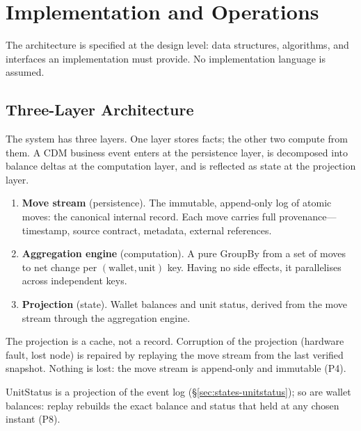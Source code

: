\section{Implementation and Operations}
\label{sec:implementation}

The architecture is specified at the design level: data structures, algorithms, and interfaces an implementation must provide. No implementation language is assumed.

\subsection{Three-Layer Architecture}
\label{sec:implementation-layers}

The system has three layers. One layer stores facts; the other two compute from them. A CDM business event enters at the persistence layer, is decomposed into balance deltas at the computation layer, and is reflected as state at the projection layer.

\begin{enumerate}[nosep]
\item \textbf{Move stream} (persistence). The immutable, append-only log of atomic moves: the canonical internal record. Each move carries full provenance---timestamp, source contract, metadata, external references.
\item \textbf{Aggregation engine} (computation). A pure GroupBy from a set of moves to net change per $(\text{wallet},\text{unit})$ key. Having no side effects, it parallelises across independent keys.
\item \textbf{Projection} (state). Wallet balances and unit status, derived from the move stream through the aggregation engine.
\end{enumerate}

The projection is a cache, not a record. Corruption of the projection (hardware fault, lost node) is repaired by replaying the move stream from the last verified snapshot. Nothing is lost: the move stream is append-only and immutable (P4).

\begin{remark}
UnitStatus is a projection of the event log (\S\ref{sec:states-unitstatus}); so are wallet balances: replay rebuilds the exact balance and status that held at any chosen instant (P8).
\end{remark}


